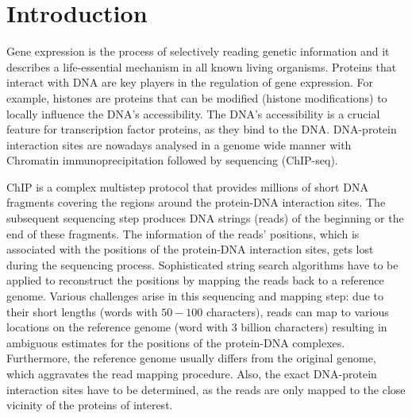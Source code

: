 \chapter{Introduction}
Gene expression is the process of selectively reading genetic information and it describes a life-essential mechanism in all known living organisms.
Proteins that interact with DNA are key players in the regulation of gene expression.
For example, histones are proteins that can be modified (histone modifications) to locally influence the DNA's accessibility.
The DNA's accessibility is a crucial feature for transcription factor proteins, as they bind to the DNA.
DNA-protein interaction sites are nowadays analysed in a genome wide manner with Chromatin immunoprecipitation followed by sequencing (ChIP-seq).

ChIP is a complex multistep protocol that provides millions of short DNA fragments covering the regions around the protein-DNA interaction sites.
The subsequent sequencing step produces DNA strings (reads) of the beginning or the end of these fragments.
The information of the reads' positions, which is associated with the positions of the protein-DNA interaction sites, gets lost during the sequencing process.
Sophisticated string search algorithms have to be applied to reconstruct the positions by mapping the reads back to a reference genome.
Various challenges arise in this sequencing and mapping step: 
due to their short lengths (words with $50-100$ characters), reads can map to various locations on the reference genome (word with $3$ billion characters) resulting in ambiguous estimates for the positions of the protein-DNA complexes.
Furthermore, the reference genome usually differs from the original genome, which aggravates the read mapping procedure.
Also, the exact DNA-protein interaction sites have to be determined, as the reads are only mapped to the close vicinity of the proteins of interest.

